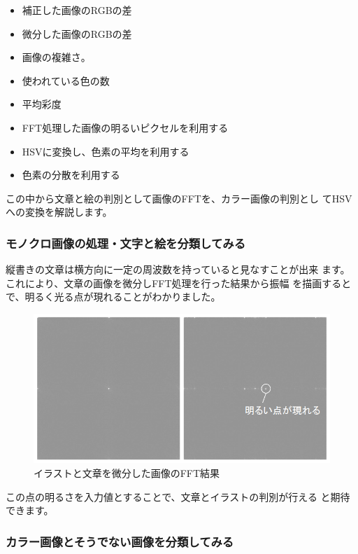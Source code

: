 \documentclass[mingoth,a4paper]{jsarticle}
\begin{document}
\begin{itemize}
\item 補正した画像のRGBの差
\item 微分した画像のRGBの差
\item 画像の複雑さ。
\item 使われている色の数
\item 平均彩度
\item FFT処理した画像の明るいピクセルを利用する
\item HSVに変換し、色素の平均を利用する
\item 色素の分散を利用する
\end{itemize}

この中から文章と絵の判別として画像のFFTを、カラー画像の判別とし
てHSVへの変換を解説します。

\subsubsection{モノクロ画像の処理・文字と絵を分類してみる}

縦書きの文章は横方向に一定の周波数を持っていると見なすことが出来
ます。これにより、文章の画像を微分しFFT処理を行った結果から振幅
を描画するとで、明るく光る点が現れることがわかりました。

\begin{figure}[H]
\begin{center}
\caption{イラストと文章を微分した画像のFFT結果}
\includegraphics[width=0.9\hsize]{image201003/neuralnet04.png}
\end{center}
\end{figure}

この点の明るさを入力値とすることで、文章とイラストの判別が行える
と期待できます。

\subsubsection{カラー画像とそうでない画像を分類してみる}
\end{document}
